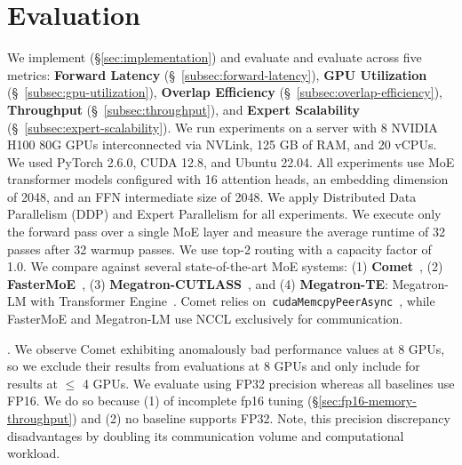\section{Evaluation}
\label{sec:evaluation}
We implement (\S\ref{sec:implementation}) and evaluate \sysname and evaluate across
five metrics: \textbf{Forward Latency} (\S~\ref{subsec:forward-latency}),
\textbf{GPU Utilization} (\S~\ref{subsec:gpu-utilization}),
\textbf{Overlap Efficiency} (\S~\ref{subsec:overlap-efficiency}),
\textbf{Throughput} (\S~\ref{subsec:throughput}), and \textbf{Expert Scalability} (\S~\ref{subsec:expert-scalability}).
We run experiments on a server with 8 NVIDIA H100 80G GPUs interconnected via NVLink,
125 GB of RAM, and 20 vCPUs. We used PyTorch 2.6.0, CUDA 12.8, and Ubuntu 22.04.
All experiments use MoE transformer models configured with 16 attention heads,
an embedding dimension of 2048, and an FFN intermediate size of 2048.
We apply Distributed Data Parallelism (DDP) and Expert Parallelism for all experiments.
We execute only the forward pass over a single MoE layer and measure the average runtime
of 32 passes after 32 warmup passes.
We use top-2 routing with a capacity factor of 1.0.
We compare \sysname against several state-of-the-art MoE systems:
(1) \textbf{Comet}~\cite{comet}, 
(2) \textbf{FasterMoE}~\cite{fastermoe}, 
(3) \textbf{Megatron-CUTLASS}~\cite{megatron-lm}, and
(4) \textbf{Megatron-TE}: Megatron-LM with Transformer Engine~\cite{transformer-engine}.
Comet relies on~\verb|cudaMemcpyPeerAsync|~\cite{fluxp2p}, while FasterMoE and Megatron-LM use NCCL exclusively for communication.

.
We observe Comet exhibiting anomalously bad performance values at 8 GPUs,
so we exclude their results from evaluations at 8 GPUs and only include for results at $\leq$
4 GPUs. We evaluate \sysname using FP32 precision whereas all baselines use FP16.
We do so because (1) of incomplete fp16 tuning (\S\ref{sec:fp16-memory-throughput})
and (2) no baseline supports FP32.
Note, this precision discrepancy disadvantages \sysname by doubling its
communication volume and computational workload.
